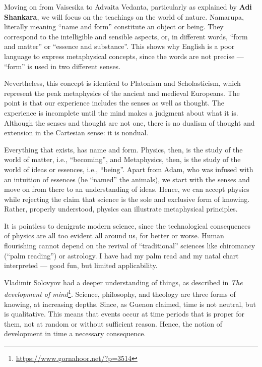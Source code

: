 Moving on from Vaisesika to Advaita Vedanta, particularly as explained by \textbf{Adi Shankara}, we will focus on the teachings on the world of nature. Namarupa, literally meaning “name and form” constitute an object or being. They correspond to the intelligible and sensible aspects, or, in different words, “form and matter” or “essence and substance”. This shows why English is a poor language to express metaphysical concepts, since the words are not precise — “form” is used in two different senses.

Nevertheless, this concept is identical to Platonism and Scholasticism, which represent the peak metaphysics of the ancient and medieval Europeans. The point is that our experience includes the senses as well as thought. The experience is incomplete until the mind makes a judgment about what it is. Although the senses and thought are not one, there is no dualism of thought and extension in the Cartesian sense: it is nondual.

Everything that exists, has name and form. Physics, then, is the study of the world of matter, i.e., “becoming”, and Metaphysics, then, is the study of the world of ideas or essences, i.e., “being”. Apart from Adam, who was infused with an intuition of essences (he “named” the animals), we start with the senses and move on from there to an understanding of ideas. Hence, we can accept physics while rejecting the claim that science is the sole and exclusive form of knowing. Rather, properly understood, physics can illustrate metaphysical principles.

It is pointless to denigrate modern science, since the technological consequences of physics are all too evident all around us, for better or worse. Human flourishing cannot depend on the revival of “traditional” sciences like chiromancy (“palm reading”) or astrology. I have had my palm read and my natal chart interpreted — good fun, but limited applicability.

Vladimir Solovyov had a deeper understanding of things, as described in \textit{The development of mind}\footnote{\url{https://www.gornahoor.net/?p=3514}}. Science, philosophy, and theology are three forms of knowing, at increasing depths. Since, as Guenon claimed, time is not neutral, but is qualitative. This means that events occur at time periods that is proper for them, not at random or without sufficient reason. Hence, the notion of development in time a necessary consequence.

